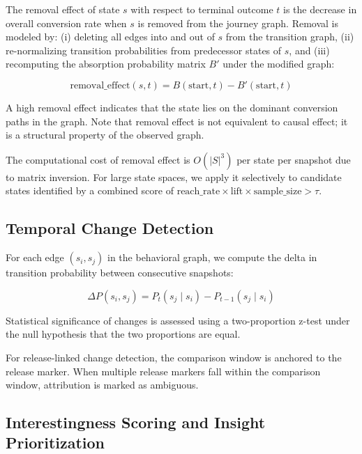 \documentclass[12pt, a4paper]{article}
\begin{document}
The removal effect of state $s$ with respect to terminal outcome $t$ is the decrease in overall conversion rate when $s$ is removed from the journey graph. Removal is modeled by: (i) deleting all edges into and out of $s$ from the transition graph, (ii) re-normalizing transition probabilities from predecessor states of $s$, and (iii) recomputing the absorption probability matrix $B'$ under the modified graph:

\begin{equation}
  \text{removal\_effect}(s, t) = B(\text{start}, t) - B'(\text{start}, t)
  \label{eq:removal}
\end{equation}

A high removal effect indicates that the state lies on the dominant conversion paths in the graph. Note that removal effect is not equivalent to causal effect; it is a structural property of the observed graph.

The computational cost of removal effect is $O(|S|^3)$ per state per snapshot due to matrix inversion. For large state spaces, we apply it selectively to candidate states identified by a combined score of $\text{reach\_rate} \times \text{lift} \times \text{sample\_size} > \tau$.

\subsection{Temporal Change Detection}

For each edge $(s_i, s_j)$ in the behavioral graph, we compute the delta in transition probability between consecutive snapshots:

\begin{equation}
  \Delta P(s_i, s_j) = P_t(s_j \mid s_i) - P_{t-1}(s_j \mid s_i)
  \label{eq:temporal}
\end{equation}

Statistical significance of changes is assessed using a two-proportion z-test under the null hypothesis that the two proportions are equal.

For release-linked change detection, the comparison window is anchored to the release marker. When multiple release markers fall within the comparison window, attribution is marked as ambiguous.

\subsection{Interestingness Scoring and Insight Prioritization}
\end{document}
